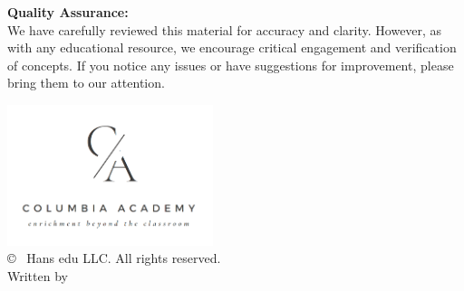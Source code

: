 \begin{center}
\begin{minipage}{0.85\textwidth}
    {\small\textbf{Quality Assurance:}}\\[0.2cm]
    {\footnotesize
    We have carefully reviewed this material for accuracy and clarity. However, 
    as with any educational resource, we encourage critical engagement and 
    verification of concepts. If you notice any issues or have suggestions for 
    improvement, please bring them to our attention.}
  \end{minipage}
  \includegraphics[width=0.45\textwidth]{images/CA_LastVersion.png}\\
  {\small © \the\year\ Hans edu LLC. All rights reserved.}\\[0.5cm]
  {\small Written by \BookAuthor}\\[1cm]
\end{center}

\newpage
